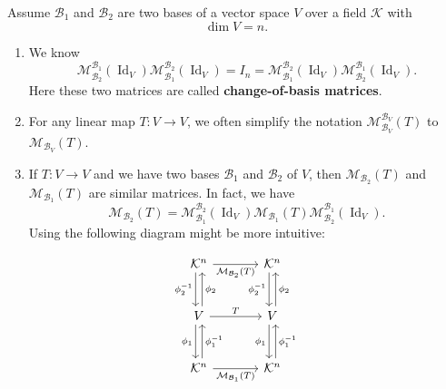 \documentclass{ctexart}
\begin{document}
	\begin{mypro}
		Assume $\mathcal{B}_1$ and $\mathcal{B}_2$ are two bases of a vector space $V$ over a field $\mathcal{K}$ with
		\[
		\dim V = n.
		\]
		
		\begin{enumerate}
			\item We know \[
			\mathcal{M} ^{\mathcal{B}_1}_{\mathcal{B}_2}(\operatorname{Id}_V)
			 \mathcal{M} ^{\mathcal{B}_2}_{\mathcal{B}_1}(\operatorname{Id}_V)  = I_n = \mathcal{M} ^{\mathcal{B}_2}_{\mathcal{B}_1}(\operatorname{Id}_V) 
			\mathcal{M} ^{\mathcal{B}_1}_{\mathcal{B}_2}(\operatorname{Id}_V).
			\]
			Here these two matrices are called \textbf{change-of-basis matrices}.
			\item For any linear map $T: V \to V$, we often simplify the notation $\mathcal{M} ^{\mathcal{B}_V}_{\mathcal{B}_V}(T)$ to $\mathcal{M} _{\mathcal{B}_V}(T)$.
			\item If $T:V\to V$ and we have two bases $\mathcal{B}_1$ and $\mathcal{B}_2$ of $V$, then $ \mathcal{M} _{\mathcal{B}_2}(T)$ and $\mathcal{M} _{\mathcal{B}_1}(T)$ are similar matrices. In fact, we have
			\[
			\mathcal{M} _{\mathcal{B}_2}(T) =
			\mathcal{M} ^{\mathcal{B}_2}_{\mathcal{B}_1}(\operatorname{Id}_V)
			\mathcal{M} _{\mathcal{B}_1}(T) 
			\mathcal{M} ^{\mathcal{B}_1}_{\mathcal{B}_2}(\operatorname{Id}_V).
			\]
			Using the following diagram might be more intuitive:
		\end{enumerate}
		\[
		\begin{tikzcd}[row sep=large, column sep=large]
			\mathcal{K}^n
			\arrow[r, "\mathcal{M} _{\mathcal{B}_2}(T)"']
			\arrow[d, xshift=-0.6ex, "\phi_2^{-1}" ']
			& \mathcal{K}^n
			\arrow[d, xshift=-0.6ex, "\phi_2^{-1}"'] \\
			V
			\arrow[r, "T"]
			\arrow[u, xshift=0.6ex, "\phi_2"']
			\arrow[d, xshift=-0.6ex, "\phi_1"']
			& V
			\arrow[u, xshift=0.6ex, "\phi_2"']
			\arrow[d, xshift=-0.6ex, "\phi_1"'] \\
			\mathcal{K}^n
			\arrow[r, "\mathcal{M} _{\mathcal{B}_1}(T)"']
			\arrow[u, xshift=0.6ex, "\phi_1^{-1}" ']
			& \mathcal{K}^n
			\arrow[u, xshift=0.6ex, "\phi_1^{-1}"']
		\end{tikzcd}
		\]
	\end{mypro}
\end{document}
